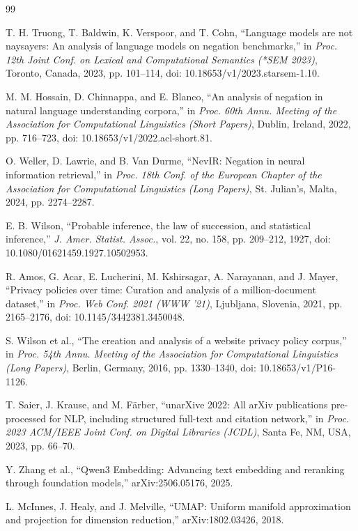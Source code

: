 \documentclass[11pt,a4paper]{article}
\begin{document}
\begin{thebibliography}{99}
\small

 T. H. Truong, T. Baldwin, K. Verspoor, and T. Cohn, ``Language models are not naysayers: An analysis of language models on negation benchmarks,'' in \emph{Proc. 12th Joint Conf. on Lexical and Computational Semantics (*SEM 2023)}, Toronto, Canada, 2023, pp. 101–114, doi: 10.18653/v1/2023.starsem-1.10.

 M. M. Hossain, D. Chinnappa, and E. Blanco, ``An analysis of negation in natural language understanding corpora,'' in \emph{Proc. 60th Annu. Meeting of the Association for Computational Linguistics (Short Papers)}, Dublin, Ireland, 2022, pp. 716–723, doi: 10.18653/v1/2022.acl-short.81.

 O. Weller, D. Lawrie, and B. Van Durme, ``NevIR: Negation in neural information retrieval,'' in \emph{Proc. 18th Conf. of the European Chapter of the Association for Computational Linguistics (Long Papers)}, St. Julian's, Malta, 2024, pp. 2274–2287.

 E. B. Wilson, ``Probable inference, the law of succession, and statistical inference,'' \emph{J. Amer. Statist. Assoc.}, vol. 22, no. 158, pp. 209–212, 1927, doi: 10.1080/01621459.1927.10502953.

 R. Amos, G. Acar, E. Lucherini, M. Kshirsagar, A. Narayanan, and J. Mayer, ``Privacy policies over time: Curation and analysis of a million-document dataset,'' in \emph{Proc. Web Conf. 2021 (WWW '21)}, Ljubljana, Slovenia, 2021, pp. 2165–2176, doi: 10.1145/3442381.3450048.

 S. Wilson et al., ``The creation and analysis of a website privacy policy corpus,'' in \emph{Proc. 54th Annu. Meeting of the Association for Computational Linguistics (Long Papers)}, Berlin, Germany, 2016, pp. 1330–1340, doi: 10.18653/v1/P16-1126.

 T. Saier, J. Krause, and M. Färber, ``unarXive 2022: All arXiv publications pre-processed for NLP, including structured full-text and citation network,'' in \emph{Proc. 2023 ACM/IEEE Joint Conf. on Digital Libraries (JCDL)}, Santa Fe, NM, USA, 2023, pp. 66–70.

 Y. Zhang et al., ``Qwen3 Embedding: Advancing text embedding and reranking through foundation models,'' arXiv:2506.05176, 2025.

 L. McInnes, J. Healy, and J. Melville, ``UMAP: Uniform manifold approximation and projection for dimension reduction,'' arXiv:1802.03426, 2018.


\end{thebibliography}
\end{document}
